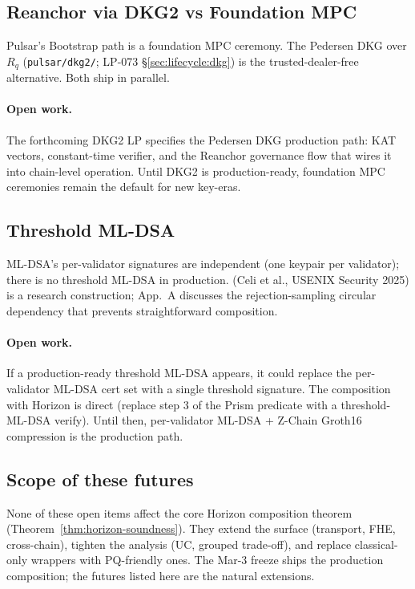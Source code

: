 \subsection{Reanchor via DKG2 vs Foundation MPC}

Pulsar's Bootstrap path is a foundation MPC ceremony. The Pedersen DKG over $R_q$ (\texttt{pulsar/dkg2/}; LP-073 \cite{luxpulsar} \S\ref{sec:lifecycle:dkg}) is the trusted-dealer-free alternative. Both ship in parallel.

\paragraph{Open work.} The forthcoming DKG2 LP specifies the Pedersen DKG production path: KAT vectors, constant-time verifier, and the Reanchor governance flow that wires it into chain-level operation. Until DKG2 is production-ready, foundation MPC ceremonies remain the default for new key-eras.

\subsection{Threshold ML-DSA}

ML-DSA's per-validator signatures are independent (one keypair per validator); there is no threshold ML-DSA in production. \cite{tmldsa2025} (Celi et al., USENIX Security 2025) is a research construction; \cite{quasarcertsoundness} App.~A discusses the rejection-sampling circular dependency that prevents straightforward composition.

\paragraph{Open work.} If a production-ready threshold ML-DSA appears, it could replace the per-validator ML-DSA cert set with a single threshold signature. The composition with Horizon is direct (replace step 3 of the Prism predicate with a threshold-ML-DSA verify). Until then, per-validator ML-DSA + Z-Chain Groth16 compression is the production path.

\subsection{Scope of these futures}

None of these open items affect the core Horizon composition theorem (Theorem~\ref{thm:horizon-soundness}). They extend the surface (transport, FHE, cross-chain), tighten the analysis (UC, grouped trade-off), and replace classical-only wrappers with PQ-friendly ones. The Mar-3 freeze ships the production composition; the futures listed here are the natural extensions.
